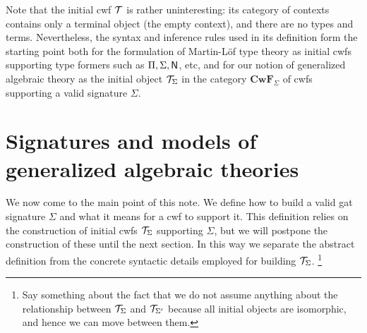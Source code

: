 \documentclass{lmcs}
\def\Cwf{\mathbf{CwF}}
\begin{document}
Note that the initial cwf ${\mathcal T}$ is rather uninteresting: its category of contexts contains only a terminal object (the empty context), and there are no types and terms. Nevertheless, the syntax and inference rules used in its definition form the starting point both for the formulation of Martin-Löf type theory as initial cwfs supporting type formers such as $\Pi, \Sigma, \mathsf{N}$, etc, and for our notion of generalized algebraic theory as the initial object ${\mathcal T}_\Sigma$ in the category $\Cwf_\Sigma$ of cwfs supporting a valid signature $\Sigma$.

\section{Signatures and models of generalized algebraic theories}

We now come to the main point of this note. We define how to build a valid gat signature $\Sigma$ and what it means for a cwf to support it. This definition relies on the construction of initial cwfs ${\mathcal T}_\Sigma$ supporting $\Sigma$, but we will postpone the construction of these until the next section. In this way we separate the abstract definition from the concrete syntactic details employed for building ${\mathcal T}_\Sigma$. 
\footnote{Say something about the fact that we do not assume anything about the relationship between ${\mathcal T}_\Sigma$ and ${\mathcal T}_{\Sigma'}$ because all initial objects are isomorphic, and hence we can move between them.}
\end{document}
